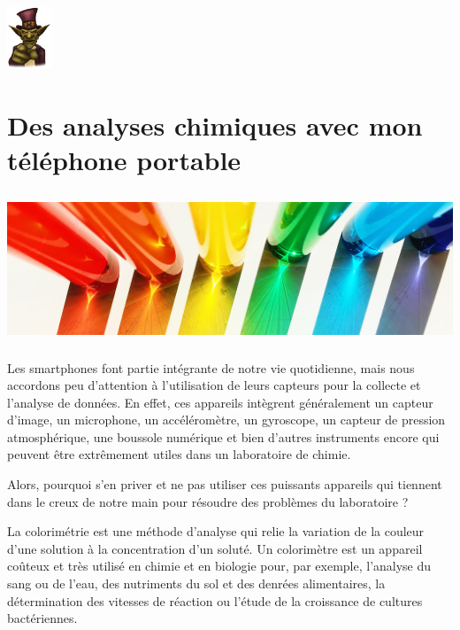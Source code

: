 \documentclass[
  10pt,
  french,
  a5paper,
  openany]{book}
\begin{document}
\begin{flushright}
\includegraphics[width=\textwidth,height=5em]{images/le-jeu-video-fiction-ou-realite-2.jpg}

\end{flushright}

\hypertarget{des-analyses-chimiques-avec-mon-tuxe9luxe9phone-portable}{%
\chapter{\texorpdfstring{Des analyses chimiques \linebreak avec mon téléphone portable}{Des analyses chimiques avec mon téléphone portable}}\label{des-analyses-chimiques-avec-mon-tuxe9luxe9phone-portable}}

\begin{center}
\includegraphics[width=\textwidth,height=12em]{images/analyses-chimiques-telephone-portable.jpg}

\end{center}

Les smartphones font partie intégrante de notre vie quotidienne, mais nous accordons peu d'attention à l'utilisation de leurs capteurs pour la collecte et l'analyse de données. En effet, ces appareils intègrent généralement un capteur d'image, un microphone, un accéléromètre, un gyroscope, un capteur de pression atmosphérique, une boussole numérique et bien d'autres instruments encore qui peuvent être extrêmement utiles dans un laboratoire de chimie.

Alors, pourquoi s'en priver et ne pas utiliser ces puissants appareils qui tiennent dans le creux de notre main pour résoudre des problèmes du laboratoire ?

La colorimétrie est une méthode d'analyse qui relie la variation de la couleur d'une solution à la concentration d'un soluté. Un colorimètre est un appareil coûteux et très utilisé en chimie et en biologie pour, par exemple, l'analyse du sang ou de l'eau, des nutriments du sol et des denrées alimentaires, la détermination des vitesses de réaction ou l'étude de la croissance de cultures bactériennes.
\end{document}
